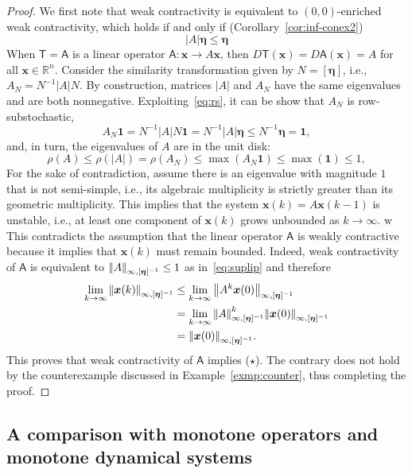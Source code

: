 \documentclass[journal,twoside,web]{ieeecolor}
\newcommand{\abs}[1]{{\left\vert #1 \right\vert}}
\newcommand{\norm}[1]{{\left\vert\kern-0.25ex\left\vert #1\right\vert\kern-0.25ex\right\vert}}
\newcommand{\rea }{\mathbb{R}}
\newcommand{\xb}{\boldsymbol{x}}
\newcommand{\etab}{\boldsymbol{\eta}}
\newcommand{\Ts}{\mathsf{T}}
\newcommand{\As}{\mathsf{A}}
\newcommand{\bone}{\boldsymbol{1}}
\begin{document}
\begin{proof}
%
We first note that weak contractivity is equivalent to $(0,0)$-enriched weak contractivity, which holds if and only if (Corollary~\ref{cor:inf-conex2})
%
\begin{equation}\label{eq:rs}
\abs{A}\etab\leq \etab
\end{equation}
%
When $\Ts=\As$ is a linear operator ${\As:\xb\rightarrow A\xb}$, then $D\Ts(\xb) = D\As(\xb) = A$ for all ${\xb\in\rea^n}$.
%
Consider the similarity transformation given by $N=[\etab]$, i.e., ${A_N = N^{-1}\abs{A}N}$. By construction, matrices $\abs{A}$ and $A_N$ have the same eigenvalues and are both nonnegative.
%
Exploiting~\eqref{eq:rs}, it can be show that $A_N$ is row-substochastic,
%
$$
A_N\bone = N^{-1}\abs{A}N\bone  = N^{-1}\abs{A}\etab \leq N^{-1}\etab = \bone,
$$
%
and, in turn, the eigenvalues of $A$ are in the unit disk:
%
$$
\rho(A) \leq \rho(\abs{A}) = \rho(A_N) \leq \max(A_N\bone) \leq \max(\bone) \leq 1,
$$
%
For the sake of contradiction, assume there is an eigenvalue with magnitude $1$ that is not semi-simple, i.e., its algebraic multiplicity is strictly greater than its geometric multiplicity. This implies that the system ${\xb(k)=A\xb(k-1)}$ is unstable, i.e., at least one component of $\xb(k)$ grows unbounded as $k\rightarrow\infty$.
w%
This contradicts the assumption that the linear operator $\As$ is weakly contractive because it implies that $\xb(k)$ must remain bounded. Indeed, weak contractivity of $\As$ is equivalent to ${\norm{A}_{\infty,[\etab]^{-1}} \leq 1}$ as in~\eqref{eq:suplip} and therefore
%
$$
\begin{aligned}
    \lim_{k\rightarrow\infty} \norm{\xb(k)}_{\infty,[\etab]^{-1}} &\leq \lim_{k\rightarrow\infty} \norm{A^k\xb(0)}_{\infty,[\etab]^{-1}} \\
    & = \lim_{k\rightarrow\infty} \norm{A}^k_{\infty,[\etab]^{-1}} \norm{\xb(0)}_{\infty,[\etab]^{-1}}\\
    & = \norm{\xb(0)}_{\infty,[\etab]^{-1}}. 
\end{aligned}
$$
This proves that weak contractivity of $\As$ implies ($\star$). The contrary does not hold by the counterexample discussed in Example~\ref{exmp:counter}, thus completing the proof.
\end{proof}

\subsection{A comparison with monotone operators and monotone dynamical systems}\label{sec:monotone}
%
\end{document}
